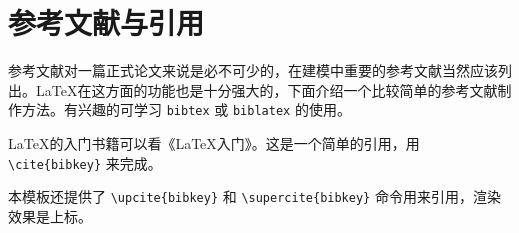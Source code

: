 \section{参考文献与引用}

参考文献对一篇正式论文来说是必不可少的，在建模中重要的参考文献当然应该列出。\LaTeX{}在这方面的功能也是十分强大的，下面介绍一个比较简单的参考文献制作方法。有兴趣的可学习 \verb|bibtex| 或 \verb|biblatex| 的使用。

\LaTeX{}的入门书籍可以看《\LaTeX{}入门》\cite{liuhaiyang2013latex}。这是一个简单的引用，用 \verb|\cite{bibkey}| 来完成。

本模板还提供了 \verb|\upcite{bibkey}| 和 \verb|\supercite{bibkey}| 命令用来引用，渲染效果是上标。
